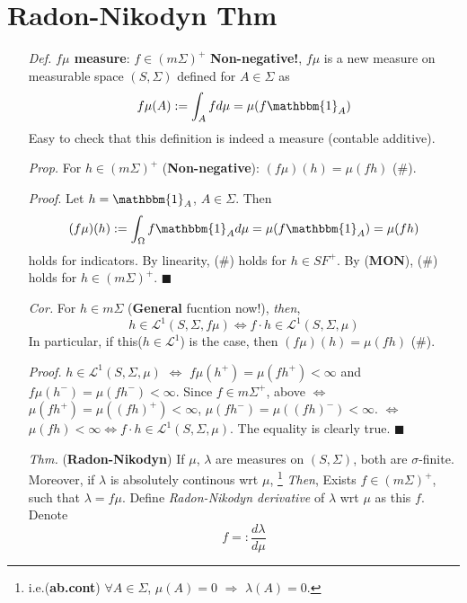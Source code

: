 \documentclass[a4paper,12pt,twoside]{book}
\begin{document}
\section{Radon-Nikodyn Thm}
\begin{itemize}
	\item[\textit{Def.}] \textbf{$f\mu$ measure}: $f\in (m\Sigma)^+$ \textbf{Non-negative!}, $f\mu$ is a new measure on measurable space $(S, \Sigma)$ defined for $A\in \Sigma$ as
	\begin{equation}
		f\mu(A) := \int_A fd\mu = \mu(f \mathbbm{1}_{A})
	\end{equation}
	Easy to check that this definition is indeed a measure (contable additive).

	\item[\textit{Prop.}] For $h\in (m\Sigma)^+$ (\textbf{Non-negative}): $(f\mu)(h)=\mu(fh)$ (\#).
	\item[\textit{Proof}.] Let $h=\mathbbm{1}_{A}$, $A\in \Sigma$. Then
	\begin{equation}
		(f\mu)(h):= \int_{\Omega} f\mathbbm{1}_{A} d\mu = \mu(f \mathbbm{1}_{A})=\mu(fh)
	\end{equation}
	holds for indicators.
	By linearity, (\#) holds for $h\in SF^+$.\newline
	By (\textbf{MON}), (\#) holds for $h\in (m\Sigma)^+$. $\blacksquare$

	\item[\textit{Cor.}] For $h\in m\Sigma$ (\textbf{General} fucntion now!), \textit{then},
	\begin{equation}
		h \in \mathcal{L}^1(S, \Sigma, f\mu) \iff f\cdot h\in \mathcal{L}^1(S,\Sigma, \mu)
	\end{equation}
	In particular, if this($h\in \mathcal{L}^1$) is the case, then $(f\mu)(h)=\mu(fh)$ (\#).
	\item[\textit{Proof.}] $h\in \mathcal{L}^1(S, \Sigma, \mu)$ $\iff$ $f\mu(h^+)=\mu(fh^+)<\infty$ and $f\mu(h^-)=\mu(fh^-)<\infty$. \newline
	Since $f\in m\Sigma^+$, above $\iff$ $\mu(fh^+)=\mu((fh)^+)<\infty$, $\mu(fh^-)=\mu((fh)^-)<\infty$. \newline
	$\iff$ $\mu(fh)<\infty \iff f\cdot h\in \mathcal{L}^1(S,\Sigma, \mu)$. The equality is clearly true. $\blacksquare$

	\item[\textit{Thm.}] (\textbf{Radon-Nikodyn}) If $\mu$, $\lambda$ are measures on $(S, \Sigma)$, both are $\sigma$-finite. Moreover, if $\lambda$ is absolutely continous wrt $\mu$, \footnote{i.e.(\textbf{ab.cont}) $\forall A\in \Sigma$, $\mu(A)=0$ $\Rightarrow$ $\lambda(A)=0$.} \textit{Then}, \newline
	Exists $f\in (m\Sigma)^+$, such that $\lambda = f\mu$. Define \textit{Radon-Nikodyn derivative} of $\lambda$ wrt $\mu$ as this $f$. Denote
	$$f=:\frac{d\lambda}{d\mu}$$ 

\end{itemize}
\end{document}
